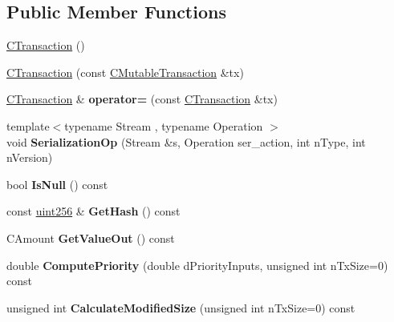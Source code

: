 \subsection*{Public Member Functions}
\begin{DoxyCompactItemize}
\item 
\mbox{\hyperlink{class_c_transaction_a41717180530fca69eb0163c1024ae286}{C\+Transaction}} ()
\item 
\mbox{\hyperlink{class_c_transaction_a6607e95af3e2851ee3b7fe335a05eb4c}{C\+Transaction}} (const \mbox{\hyperlink{struct_c_mutable_transaction}{C\+Mutable\+Transaction}} \&tx)
\item 
\mbox{\label{class_c_transaction_a93a05df7088ebef96adb2ea0442380e8}} 
\mbox{\hyperlink{class_c_transaction}{C\+Transaction}} \& {\bfseries operator=} (const \mbox{\hyperlink{class_c_transaction}{C\+Transaction}} \&tx)
\item 
\mbox{\label{class_c_transaction_aa79659fab1e973a058494393209b0a59}} 
{\footnotesize template$<$typename Stream , typename Operation $>$ }\\void {\bfseries Serialization\+Op} (Stream \&s, Operation ser\+\_\+action, int n\+Type, int n\+Version)
\item 
\mbox{\label{class_c_transaction_a52965f371d2d3f723e88e60c8e68d6d0}} 
bool {\bfseries Is\+Null} () const
\item 
\mbox{\label{class_c_transaction_a7efd1379de830341417c0bfa23a149aa}} 
const \mbox{\hyperlink{classuint256}{uint256}} \& {\bfseries Get\+Hash} () const
\item 
\mbox{\label{class_c_transaction_aa4ce691dbb2ce32838d94d15801f6644}} 
C\+Amount {\bfseries Get\+Value\+Out} () const
\item 
\mbox{\label{class_c_transaction_adccb264c374e4ad57e699947540256f8}} 
double {\bfseries Compute\+Priority} (double d\+Priority\+Inputs, unsigned int n\+Tx\+Size=0) const
\item 
\mbox{\label{class_c_transaction_a001aa818efad11751db060dd447dc28b}} 
unsigned int {\bfseries Calculate\+Modified\+Size} (unsigned int n\+Tx\+Size=0) const

\end{DoxyCompactItemize}
